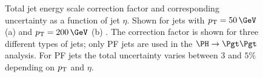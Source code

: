 \begin{figure}
\begin{center}

\end{center}
\caption[Total jet energy scale correction factor and corresponding uncertainty
as a function of jet $\eta$.]{
Total jet energy scale correction factor and corresponding uncertainty
as a function of jet $\eta$. Shown for jets with $\pt=50\,\GeV$ (a) and
$\pt=200\,\GeV$ (b) \cite{CMS-JME-10-011}. The correction factor is shown for
three different types of jets; only \ac{PF} jets are used in the $\HToTauTau$
analysis. For \ac{PF} jets the total uncertainty varies between $3$ and $5\%$
depending on $p_{\mathrm{T}}$ and $\eta$.     
}
\label{fig:jesuncert}
\end{figure}

